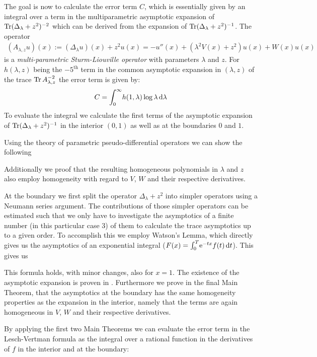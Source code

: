 The goal is now to calculate the error term $C$, which is essentially given by
an integral over a term in the multiparametric asymptotic expansion of
$\Tr(\Delta_\lambda + z^2)^{-2}$ which can be derived from the expansion of
$\Tr(\Delta_\lambda + z^2)^{-1}$. The operator
\begin{align*}
  (A_{\lambda,z}u)(x) := (\Delta_\lambda u)(x) + z^2 u(x)
           = -u''(x) + (\lambda^2 V(x) + z^2) u(x) + W(x) u(x)
\end{align*}
is a \emph{multi-parametric Sturm-Liouville operator} with parameters $\lambda$
and $z$. For $h(\lambda,z)$ being the $-5^{\text{th}}$ term in the common
asymptotic expansion in $(\lambda,z)$ of the trace $\Tr A_{\lambda,z}^{-2}$ the
error term is given by:
\begin{align*}
  C = \Integ[\infty]{0}{\lambda}{h(1,\lambda)\log\lambda}
\end{align*}
To evaluate the integral we calculate the first terms of the asymptotic
expansion of $\Tr(\Delta_\lambda + z^2)^{-1}$ in the interior $(0,1)$ as well as
at the boundaries $0$ and $1$.

Using the theory of parametric pseudo-differential operators we can show the
following
\begin{MainTheoremIntro}
  
\end{MainTheoremIntro}
Additionally we proof that the resulting homogeneous polynomials in $\lambda$
and $z$ also employ homogeneity with regard to $V$, $W$ and their respective
derivatives.

At the boundary we first split the operator $\Delta_\lambda + z^2$ into simpler
operators using a Neumann series argument. The contributions of those simpler
operators can be estimated such that we only have to investigate the asymptotics
of a finite number (in this particular case 3) of them to calculate the trace
asymptotics up to a given order.
%
To accomplish this we employ Watson's Lemma, which directly gives us the
asymptotics of an exponential integral ($F(x) =
\Integ[T]{0}{t}{\Eto{-tx}f(t)}$). This gives us
\begin{MainTheoremIntro}
  
\end{MainTheoremIntro}
This formula holds, with minor changes, also for $x=1$. The existence of the
asymptotic expansion is proven in \cite{LV13}.
%
Furthermore we prove in the final Main Theorem, that the asymptotics at the
boundary has the same homogeneity properties as the expansion in the interior,
namely that the terms are again homogeneous in $V$, $W$ and their respective
derivatives.

By applying the first two Main Theorems we can evaluate the error term in the
Lesch-Vertman formula as the integral over a rational function in the
derivatives of $f$ in the interior and at the boundary:

